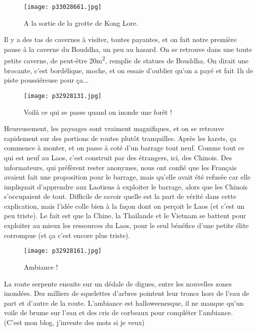 \documentclass{book}
\begin{document}
\begin{figure}[h]
\centering
\texttt{[image: p33028661.jpg]}
\caption*{A la sortie de la grotte de Kong Lore.}
\end{figure}

Il y a des tas de cavernes à visiter, toutes payantes, et on fait notre première pause à la caverne du Bouddha, un peu au hasard. On se retrouve dans une toute petite caverne, de peut-être 20m\textsuperscript{2}, remplie de statues de Bouddha. On dirait une brocante, c'est bordélique, moche, et on essaie d'oublier qu'on a payé et fait 1h de piste poussiéreuse pour ça...


\begin{figure}[h]
\centering
\texttt{[image: p32928131.jpg]}
\caption*{Voilà ce qui se passe quand on inonde une forêt !}
\end{figure}

Heureusement, les paysages sont vraiment magnifiques, et on se retrouve rapidement sur des portions de routes plutôt tranquilles. Après les karsts, ça commence à monter, et on passe à coté d'un barrage tout neuf. Comme tout ce qui est neuf au Laos, c'est construit par des étrangers, ici, des Chinois. Des informateurs, qui préfèrent rester anonymes, nous ont confié que les Français avaient fait une proposition pour le barrage, mais qu'elle avait été refusée car elle impliquait d'apprendre aux Laotiens à exploiter le barrage, alors que les Chinois s'occupaient de tout. Difficile de savoir quelle est la part de vérité dans cette explication, mais l'idée colle bien à la façon dont on perçoit le Laos (et c'est un peu triste). Le fait est que la Chine, la Thaïlande et le Vietnam se battent pour exploiter au mieux les ressources du Laos, pour le seul bénéfice d'une petite élite corrompue (et ça c'est encore plus triste).


\begin{figure}[h]
\centering
\texttt{[image: p32928161.jpg]}
\caption*{Ambiance !}
\end{figure}

La route serpente ensuite sur un dédale de digues, entre les nouvelles zones inondées. Des milliers de squelettes d'arbres pointent leur troncs hors de l'eau de part et d'autre de la route. L'ambiance est halloweenesque, il ne manque qu'un voile de brume sur l'eau et des cris de corbeaux pour compléter l'ambiance. (C'est mon blog, j'invente des mots si je veux)
\end{document}
